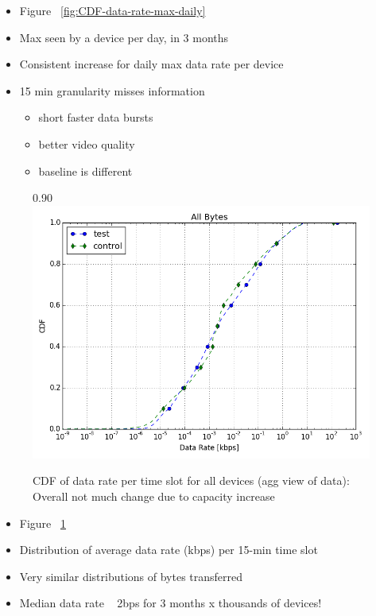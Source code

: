 
\begin{itemize}
\itemsep0em 
\item Figure ~\ref{fig:CDF-data-rate-max-daily}
\item Max seen by a device per day, in 3 months
\item Consistent increase for daily max data rate per device
\item 15 min granularity misses information
	\begin{itemize}
	\itemsep0em
	\item short faster data bursts
	\item better video quality
	\item baseline is different
	\end{itemize}
\end{itemize}



\begin{figure}[b]{0.90\linewidth}
\includegraphics[width=\linewidth]{figures/cdf-all-bytes.png}
  \caption{CDF of data rate per time slot for all devices (agg view of data): Overall not much change due to capacity increase}
  \vspace{1em}
  \label{fig:CDF-data-rate-all}
\end{figure}

\begin{itemize}
\itemsep0em 
\item Figure ~\ref{fig:CDF-data-rate-all}
\item Distribution of average data rate (kbps) per 15-min time slot 
\item Very similar distributions of bytes transferred
\item Median data rate ~ 2bps for 3 months x thousands of devices!
\end{itemize}

